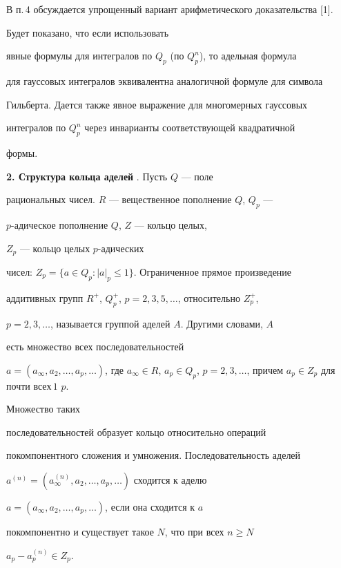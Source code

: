  


В п.\,4 обсуждается упрощенный вариант арифметического доказательства [1].


Будет показано, что если использовать 


явные формулы для интегралов по $Q_p$ (по $Q^n_p$), то адельная формула 


для гауссовых интегралов эквивалентна аналогичной формуле для символа 


Гильберта. Дается также явное выражение для многомерных гауссовых 


интегралов по $Q^n_p$ через инварианты соответствующей квадратичной 


формы. 


\medskip 


 


{\bf 2. Структура кольца аделей} \cite{2}. Пусть $Q$ --- поле 


рациональных чисел. $R$ --- вещественное пополнение $Q$, $Q_p$ --- 


$p$-адическое пополнение $Q$, $Z$ --- кольцо целых,


$Z_p$ --- кольцо целых $p$-адических 


чисел: $Z_p=\{a\in Q_p:|a|_p\le1\}$. Ограниченное прямое произведение 


аддитивных групп $R^+$, $Q^+_p$, $p=2,3,5,\dotsc$, относительно $Z^+_p$, 


$p=2,3,\dotsc$, называется группой аделей $A$. Другими словами, $A$ 


есть множество всех последовательностей 


$a=(a_\infty,a_2,\dotsc,a_p,\dotsc)$, где $a_\infty\in R$, $a_p\in 


Q_p$, $p=2,3,\dotsc$, причем $a_p\in Z_p$ для почти всех$\,{}1$ $p$.


Множество таких 


последовательностей образует кольцо относительно операций 


покомпонентного сложения и умножения. Последовательность аделей 


$a^{(n)}=(a^{(n)}_\infty,a_2,\dotsc,a_p,\dotsc)$ сходится к аделю 


$a=(a_\infty,a_2,\dotsc,a_p,\dotsc)$, если она сходится к $a$ 


покомпонентно и существует такое $N$, что при всех $n\ge N$\; 


$a_p-a^{(n)}_p\in Z_p$. 


